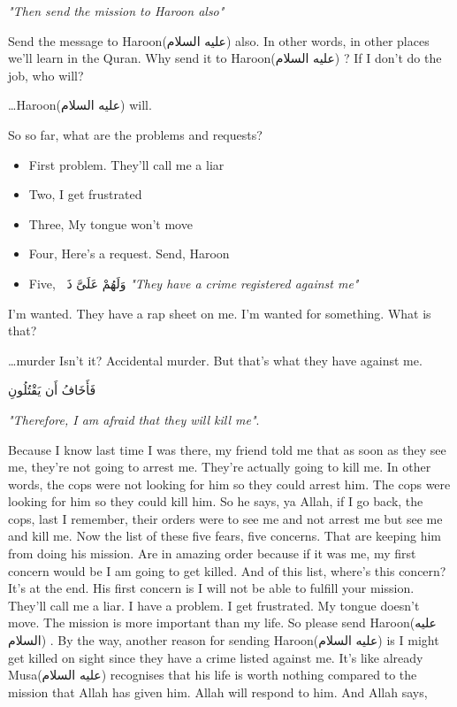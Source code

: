 \documentclass[12pt]{article}
\newcommand{\as}{\textarabic{(عليه السلام)}}
\begin{document}
\textit{"Then send the mission to Haroon also"} 
   
Send the message to Haroon\as{}  also. In other words, in other places we'll learn in the Quran. Why send it to Haroon\as{} ? If I don't do the job, who will? 

\dots Haroon\as{}  will. 

So so far, what are the problems and requests? 

\begin{itemize}
    \item First problem. They'll call me a liar 
    \item Two, I get frustrated
    \item Three, My tongue won't move
    \item Four, Here's a request. Send, Haroon
    \item Five, \textarabic{وَلَهُمْ عَلَىَّ ذَنۢبٌۭ } \textit{"They have a crime registered against me"}
\end{itemize}

I'm wanted. They have a rap sheet on me. I'm wanted for something. What is that?

\dots murder Isn't it? Accidental murder. But that's what they have against me. 

\textarabic{فَأَخَافُ أَن يَقْتُلُونِ} 

\textit{"Therefore, I am afraid that they will kill me"}.

Because I know last time I was there, my friend told me that as soon as they see me, they're not going to arrest me. They're actually going to kill me. In other words, the cops were not looking for him so they could arrest him. The cops were looking for him so they could kill him. So he says, ya Allah, if I go back, the cops, last I remember, their orders were to see me and not arrest me but see me and kill me. 
Now the list of these five fears, five concerns. That are keeping him from doing his mission. Are in amazing order because if it was me, my first concern would be I am going to get killed. And of this list, where's this concern? It's at the end. His first concern is I will not be able to fulfill your mission. They'll call me a liar. I have a problem. I get frustrated. My tongue doesn't move. The mission is more important than my life. So please send Haroon\as{} . By the way, another reason for sending Haroon\as{}  is I might get killed on sight since they have a crime listed against me. It's like already Musa\as{} recognises that his life is worth nothing compared to the mission that Allah has given him. Allah will respond to him. And Allah says, 
\end{document}

